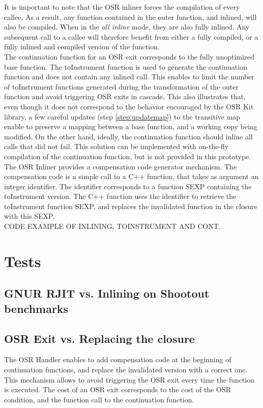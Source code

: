 It is important to note that the OSR inliner forces the compilation of every callee. 
As a result, any function contained in the outer function, and inlined, will also be compiled. 
When in the \textit{all inline} mode, they are also fully inlined.
Any subsequent call to a callee will therefore benefit from either a fully compiled, or a fully inlined and compiled version of the function.\\

The continuation function for an OSR exit corresponds to the fully unoptimized base function. 
The toInstrument function is used to generate the continuation function and does not contain any inlined call.
This enables to limit the number of toInstrument functions generated during the transformation of the outer function and avoid triggering OSR exits in cascade.
This also illustrates that, even though it does not correspond to the behavior encouraged by the OSR Kit library, a few careful updates (step \ref{step:updatemap}) to the transitive map enable to preserve a mapping between a base function, and a working copy being modified.
On the other hand, ideally, the continuation function should inline all calls that did not fail.
This solution can be implemented with on-the-fly compilation of the continuation function, but is not provided in this prototype.\\

The OSR Inliner provides a compensation code generator mechanism. 
The compensation code is a simple call to a C++ function, that takes as argument an integer identifier.
The identifier corresponds to a function SEXP containing the toInstrument version.
The C++ function uses the identifier to retrieve the toInstrument function SEXP, and replaces the invalidated function in the closure with this SEXP.\\

CODE EXAMPLE OF INLINING, TOINSTRUMENT AND CONT.\\

\section{Tests}
\subsection{GNUR RJIT vs. Inlining on Shootout benchmarks}

\subsection{OSR Exit vs. Replacing the closure}
The OSR Handler enables to add compensation code at the beginning of continuation functions, and replace the invalidated version with a correct one.
This mechanism allows to avoid triggering the OSR exit every time the function is executed.
The cost of an OSR exit corresponds to the cost of the OSR condition, and the function call to the continuation function.\\

